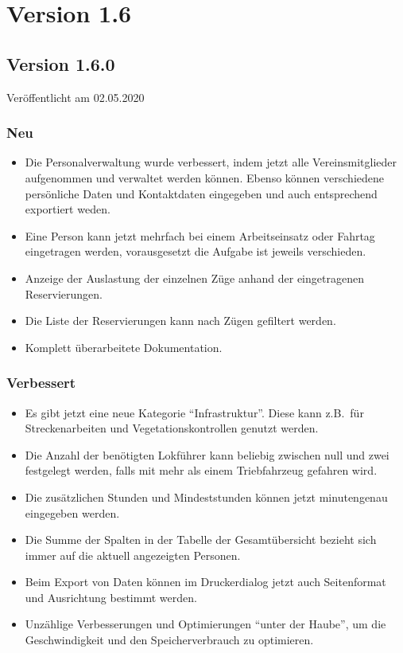 \section{Version 1.6}\label{version:1:6}
\subsection{Version 1.6.0}
\label{version:1:6:0}
Veröffentlicht am 02.05.2020
\subsubsection{Neu}
\begin{itemize}
  \item
  Die Personalverwaltung wurde verbessert, indem jetzt alle Vereinsmitglieder aufgenommen und verwaltet werden können.
  Ebenso können verschiedene persönliche Daten und Kontaktdaten eingegeben und auch entsprechend exportiert weden.
  \item
  Eine Person kann jetzt mehrfach bei einem Arbeitseinsatz oder Fahrtag eingetragen werden,
  vorausgesetzt die Aufgabe ist jeweils verschieden.
  \item
  Anzeige der Auslastung der einzelnen Züge anhand der eingetragenen Reservierungen.
  \item
  Die Liste der Reservierungen kann nach Zügen gefiltert werden.
  \item
  Komplett überarbeitete Dokumentation.
\end{itemize}

\subsubsection{Verbessert}
\begin{itemize}
  \item
  Es gibt jetzt eine neue Kategorie "`Infrastruktur"'.
  Diese kann z.B.\ für Streckenarbeiten und Vegetationskontrollen genutzt werden.
  \item
  Die Anzahl der benötigten Lokführer kann beliebig zwischen null und zwei festgelegt werden,
  falls mit mehr als einem Triebfahrzeug gefahren wird.
  \item
  Die zusätzlichen Stunden und Mindeststunden können jetzt minutengenau eingegeben werden.
  \item
  Die Summe der Spalten in der Tabelle der Gesamtübersicht bezieht sich immer auf die aktuell angezeigten Personen.
  \item
  Beim Export von Daten können im Druckerdialog jetzt auch Seitenformat und Ausrichtung bestimmt werden.
  \item
  Unzählige Verbesserungen und Optimierungen "`unter der Haube"', um die Geschwindigkeit und den Speicherverbrauch zu optimieren.
\end{itemize}

